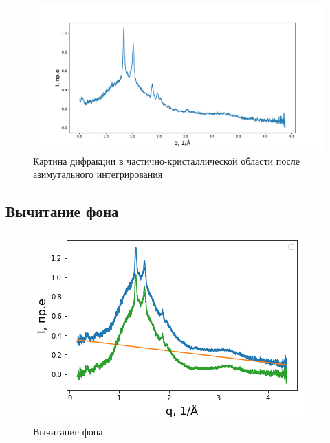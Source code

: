 		\begin{figure}[h]
    \centering
    \includegraphics[width=\linewidth]{fig/profile.pdf}
    \caption{Картина дифракции в частично-кристаллической области после азимутального интегрирования}
    \label{fig:waxs_profile}
\end{figure}
	

\subsection{Вычитание фона}

	
			\begin{figure}
\singlespacing
\vspace{-35px}
    \includegraphics[width=\linewidth]{fig/base.png}
    \vspace{3px}
    \caption{Вычитание фона}
    \label{fig:base}
\end{figure}


